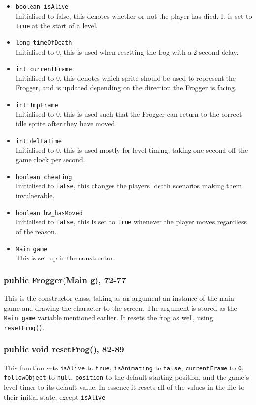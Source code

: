 \documentclass[12pt]{article}
\begin{document}
\begin{itemize}
  \item \verb|boolean isAlive|\\
    Initialised to false, this denotes whether or not the player has died. It is set to \verb|true| at the start of a level.
  \item \verb|long timeOfDeath|\\
    Initialised to 0, this is used when resetting the frog with a 2-second delay.
  \item \verb|int currentFrame|\\
    Initialised to 0, this denotes which sprite should be used to represent the Frogger, and is updated depending on the direction the Frogger is facing.
  \item \verb|int tmpFrame|\\
    Initialised to 0, this is used such that the Frogger can return to the correct idle sprite after they have moved.
  \item \verb|int deltaTime|\\
    Initialised to 0, this is used mostly for level timing, taking one second off the game clock per second.
  \item \verb|boolean cheating|\\
    Initialised to \verb|false|, this changes the players' death scenarios making them invulnerable.
  \item \verb|boolean hw_hasMoved|\\
    Initialised to \verb|false|, this is set to \verb|true| whenever the player moves regardless of the reason.
  \item \verb|Main game|\\
    This is set up in the constructor.
\end{itemize}

\subsubsection{public Frogger(Main g), 72-77}
This is the constructor class, taking as an argument an instance of the main game and drawing the character to the screen.
The argument is stored as the \verb|Main game| variable mentioned earlier.
It resets the frog as well, using \verb|resetFrog()|.

\subsubsection{public void resetFrog(), 82-89}
This function sets \verb|isAlive| to \verb|true|, \verb|isAnimating| to \verb|false|, \verb|currentFrame| to \verb|0|, \verb|followObject| to \verb|null|, \verb|position| to the default starting position, and the game's level timer to its default value.
In essence it resets all of the values in the file to their initial state, except \verb|isAlive|
\end{document}
